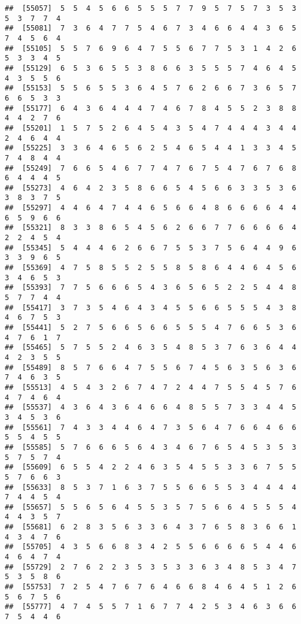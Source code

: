 \documentclass[
]{book}
\begin{document}
\begin{verbatim}
##  [55057]  5  5  4  5  6  6  5  5  5  7  7  9  5  7  5  7  3  5  3  5  3  7  7  4
##  [55081]  7  3  6  4  7  7  5  4  6  7  3  4  6  6  4  4  3  6  5  7  4  5  6  4
##  [55105]  5  5  7  6  9  6  4  7  5  5  6  7  7  5  3  1  4  2  6  5  3  3  4  5
##  [55129]  6  5  3  6  5  5  3  8  6  6  3  5  5  5  7  4  6  4  5  4  3  5  5  6
##  [55153]  5  5  6  5  5  3  6  4  5  7  6  2  6  6  7  3  6  5  7  6  6  5  3  3
##  [55177]  6  4  3  6  4  4  4  7  4  6  7  8  4  5  5  2  3  8  8  4  4  2  7  6
##  [55201]  1  5  7  5  2  6  4  5  4  3  5  4  7  4  4  4  3  4  4  2  4  6  4  4
##  [55225]  3  3  6  4  6  5  6  2  5  4  6  5  4  4  1  3  3  4  5  7  4  8  4  4
##  [55249]  7  6  6  5  4  6  7  7  4  7  6  7  5  4  7  6  7  6  8  6  4  4  4  5
##  [55273]  4  6  4  2  3  5  8  6  6  5  4  5  6  6  3  3  5  3  6  3  8  3  7  5
##  [55297]  4  4  6  4  7  4  4  6  5  6  6  4  8  6  6  6  6  4  4  6  5  9  6  6
##  [55321]  8  3  3  8  6  5  4  5  6  2  6  6  7  7  6  6  6  6  4  2  2  4  5  4
##  [55345]  5  4  4  4  6  2  6  6  7  5  5  3  7  5  6  4  4  9  6  3  3  9  6  5
##  [55369]  4  7  5  8  5  5  2  5  5  8  5  8  6  4  4  6  4  5  6  3  4  6  5  3
##  [55393]  7  7  5  6  6  6  5  4  3  6  5  6  5  2  2  5  4  4  8  5  7  7  4  4
##  [55417]  3  7  3  5  4  6  4  3  4  5  5  6  6  5  5  5  4  3  8  4  6  7  5  3
##  [55441]  5  2  7  5  6  6  5  6  6  5  5  5  4  7  6  6  5  3  6  4  7  6  1  7
##  [55465]  5  7  5  5  2  4  6  3  5  4  8  5  3  7  6  3  6  4  4  4  2  3  5  5
##  [55489]  8  5  7  6  6  4  7  5  5  6  7  4  5  6  3  5  6  3  6  7  4  6  3  5
##  [55513]  4  5  4  3  2  6  7  4  7  2  4  4  7  5  5  4  5  7  6  4  7  4  6  4
##  [55537]  4  3  6  4  3  6  4  6  6  4  8  5  5  7  3  3  4  4  5  3  4  5  3  6
##  [55561]  7  4  3  3  4  4  6  4  7  3  5  6  4  7  6  6  4  6  6  5  5  4  5  5
##  [55585]  5  7  6  6  6  5  6  4  3  4  6  7  6  5  4  5  3  5  3  5  7  5  7  4
##  [55609]  6  5  5  4  2  2  4  6  3  5  4  5  5  3  3  6  7  5  5  5  7  6  6  3
##  [55633]  8  5  3  7  1  6  3  7  5  5  6  6  5  5  3  4  4  4  4  7  4  4  5  4
##  [55657]  5  5  6  5  6  4  5  5  3  5  7  5  6  6  4  5  5  5  4  4  4  3  5  7
##  [55681]  6  2  8  3  5  6  3  3  6  4  3  7  6  5  8  3  6  6  1  4  3  4  7  6
##  [55705]  4  3  5  6  6  8  3  4  2  5  5  6  6  6  6  5  4  4  6  4  6  4  7  4
##  [55729]  2  7  6  2  2  3  5  3  5  3  3  6  3  4  8  5  3  4  7  5  3  5  8  6
##  [55753]  7  2  5  4  7  6  7  6  4  6  6  8  4  6  4  5  1  2  6  5  6  7  5  6
##  [55777]  4  7  4  5  5  7  1  6  7  7  4  2  5  3  4  6  3  6  6  7  5  4  4  6

\end{verbatim}
\end{document}
